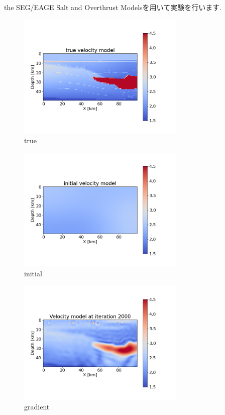 the SEG/EAGE Salt and Overthrust Modelsを用いて実験を行います.

\begin{figure}[htbp]\label{fig:true_velocity_model}
\begin{center}
    \includegraphics[width=80mm]{public/true}
    \caption{true}
\end{center}
\vspace{-\baselineskip}
\end{figure}

\begin{figure}[htbp]\label{fig:initial_velocity_model}
\vspace{-\baselineskip}
\begin{center}
    \includegraphics[width=80mm]{public/initial}
    \caption{initial}
\end{center}
\vspace{-\baselineskip}
\end{figure}

\begin{figure}[htbp]\label{fig:gradient_velocity_model}
\vspace{-\baselineskip}
\begin{center}
    \includegraphics[width=80mm]{public/gradient}
    \caption{gradient}
\end{center}
\vspace{-\baselineskip}
\end{figure}

